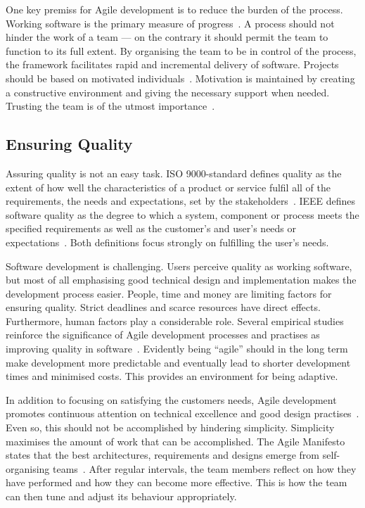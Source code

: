 \documentclass[english]{tktltiki2}
\begin{document}
One key premiss for Agile development is to reduce the burden of the process. Working software is the primary measure of progress~\cite{BBB01b}. A process should not hinder the work of a team — on the contrary it should permit the team to function to its full extent. By organising the team to be in control of the process, the framework facilitates rapid and incremental delivery of software. Projects should be based on motivated individuals~\cite{BBB01b}. Motivation is maintained by creating a constructive environment and giving the necessary support when needed. Trusting the team is of the utmost importance~\cite{BBB01b}.

\subsection{Ensuring Quality}

Assuring quality is not an easy task. ISO 9000-standard defines quality as the extent of how well the characteristics of a product or service fulfil all of the requirements, the needs and expectations, set by the stakeholders~\cite{ISO9000}. IEEE defines software quality as the degree to which a system, component or process meets the specified requirements as well as the customer’s and user’s needs or expectations~\cite{IEEE1074}. Both definitions focus strongly on fulfilling the user’s needs.

Software development is challenging. Users perceive quality as working software, but most of all emphasising good technical design and implementation makes the development process easier. People, time and money are limiting factors for ensuring quality. Strict deadlines and scarce resources have direct effects. Furthermore, human factors play a considerable role. Several empirical studies reinforce the significance of Agile development processes and practises as improving quality in software~\cite{SS10}. Evidently being “agile” should in the long term make development more predictable and eventually lead to shorter development times and minimised costs. This provides an environment for being adaptive.

In addition to focusing on satisfying the customers needs, Agile development promotes continuous attention on technical excellence and good design practises~\cite{BBB01b}. Even so, this should not be accomplished by hindering simplicity. Simplicity maximises the amount of work that can be accomplished. The Agile Manifesto states that the best architectures, requirements and designs emerge from self-organising teams~\cite{BBB01b}. After regular intervals, the team members reflect on how they have performed and how they can become more effective. This is how the team can then tune and adjust its behaviour appropriately.
\end{document}
